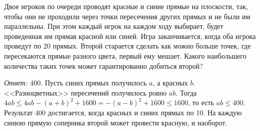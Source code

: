 Двое игроков по очереди проводят красные и синие прямые на плоскости, так,
чтобы они не проходили через точки пересечения других прямых и не были им
параллельны.
При этом каждый игрок на каждом ходу выбирает, будет проведенная им прямая
красной или синей.
Игра заканчивается, когда оба игрока проведут по $20$ прямых.
Второй старается сделать как можно больше точек, где пересекаются прямые
разного цвета, первый ему мешает.
Какого наибольшего количества таких точек может гарантированно добиться второй?

\solution
\emph{Ответ:}
$400$.
Пусть синих прямых получилось $a$, а красных $b$.
<<Разноцветных>> пересечений получилось ровно $a b$.
Тогда
\(
    4 a b
\leq
    4 a b - (a + b)^2 + 1600
=
    -(a - b)^2 + 1600
\leq
    1600
\),
то есть $a b \leq 400$.
Результат $400$ достигается, когда красных и синих прямых по 10.
На каждую синюю прямую соперника второй может провести красную, и наоборот.

